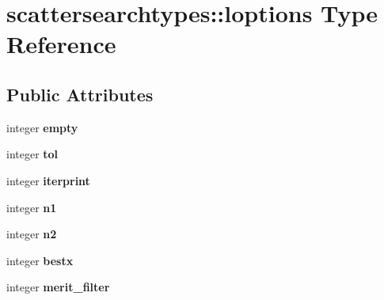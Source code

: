 \hypertarget{structscattersearchtypes_1_1loptions}{\section{scattersearchtypes\-:\-:loptions Type Reference}
\label{structscattersearchtypes_1_1loptions}
}
\subsection*{Public Attributes}
\begin{DoxyCompactItemize}
\item 
\hypertarget{structscattersearchtypes_1_1loptions_a242fba85ee6cf2e95ff178860a6d5bc7}{integer {\bfseries empty}}\label{structscattersearchtypes_1_1loptions_a242fba85ee6cf2e95ff178860a6d5bc7}

\item 
\hypertarget{structscattersearchtypes_1_1loptions_a9bf45231d2a46feb0a0c64d8f5ff7738}{integer {\bfseries tol}}\label{structscattersearchtypes_1_1loptions_a9bf45231d2a46feb0a0c64d8f5ff7738}

\item 
\hypertarget{structscattersearchtypes_1_1loptions_a328e9cd4a13d982bd0c3470251e768b2}{integer {\bfseries iterprint}}\label{structscattersearchtypes_1_1loptions_a328e9cd4a13d982bd0c3470251e768b2}

\item 
\hypertarget{structscattersearchtypes_1_1loptions_a70564b928679a166d9a40659085f892d}{integer {\bfseries n1}}\label{structscattersearchtypes_1_1loptions_a70564b928679a166d9a40659085f892d}

\item 
\hypertarget{structscattersearchtypes_1_1loptions_ad4f414d11b6f13f0d60c75beda37cc34}{integer {\bfseries n2}}\label{structscattersearchtypes_1_1loptions_ad4f414d11b6f13f0d60c75beda37cc34}

\item 
\hypertarget{structscattersearchtypes_1_1loptions_aae0cfba089143f9d2c2f321e477a0f71}{integer {\bfseries bestx}}\label{structscattersearchtypes_1_1loptions_aae0cfba089143f9d2c2f321e477a0f71}

\item 
\hypertarget{structscattersearchtypes_1_1loptions_a2f3b6e8292307614c673dc6959497852}{integer {\bfseries merit\-\_\-filter}}\label{structscattersearchtypes_1_1loptions_a2f3b6e8292307614c673dc6959497852}


\end{DoxyCompactItemize}
